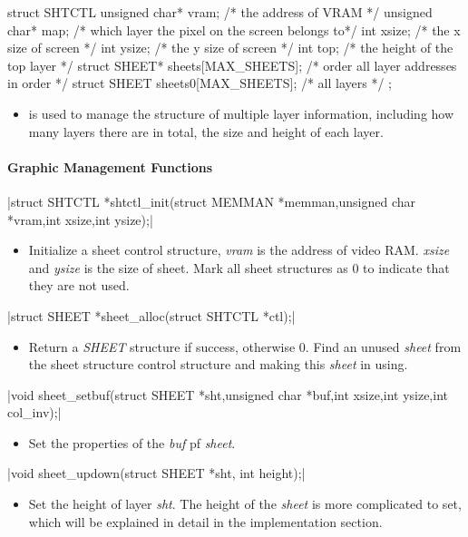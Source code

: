 \documentclass{swfcthesis}
\begin{document}
\begin{codeblock}[1]
\begin{ccode}
struct SHTCTL
{ 
  unsigned char* vram; /* the address of VRAM */
  unsigned char* map;  /* which layer the pixel on the screen belongs to*/
  int xsize; /* the x size of screen */
  int ysize; /* the y size of screen */
  int top;   /* the height of the top layer */
  struct SHEET* sheets[MAX_SHEETS]; /* order all layer addresses in order */
  struct SHEET sheets0[MAX_SHEETS]; /* all layers */
};
\end{ccode}
\end{codeblock}
\begin{itemize}
\item is used to manage the structure of multiple layer information, including how many
  layers there are in total, the size and height of each layer.
\end{itemize}

\paragraph{Graphic Management Functions}

\csingle|struct SHTCTL *shtctl_init(struct MEMMAN *memman,unsigned char *vram,int xsize,int ysize);|
\begin{itemize}
\item Initialize a sheet control structure, \emph{vram} is the address of video
  RAM. \emph{xsize} and \emph{ysize} is the size of sheet. Mark all sheet structures
  as 0 to indicate that they are not used.
  
\end{itemize}

\csingle|struct SHEET *sheet_alloc(struct SHTCTL *ctl);|
\begin{itemize}
\item Return a \emph{SHEET} structure if success, otherwise 0. Find an unused \emph{sheet} from
  the sheet structure control structure and making this \emph{sheet} in using.
  
\end{itemize}

\csingle|void sheet_setbuf(struct SHEET *sht,unsigned char *buf,int xsize,int ysize,int col_inv);|
\begin{itemize}
\item Set the properties of the \emph{buf} pf \emph{sheet}. 
\end{itemize}

\csingle|void sheet_updown(struct SHEET *sht, int height);|
\begin{itemize}
\item Set the height of layer \emph{sht}. The height of the \emph{sheet} is more complicated to
  set, which will be explained in detail in the implementation section.
  
  
\end{itemize}
\end{document}
